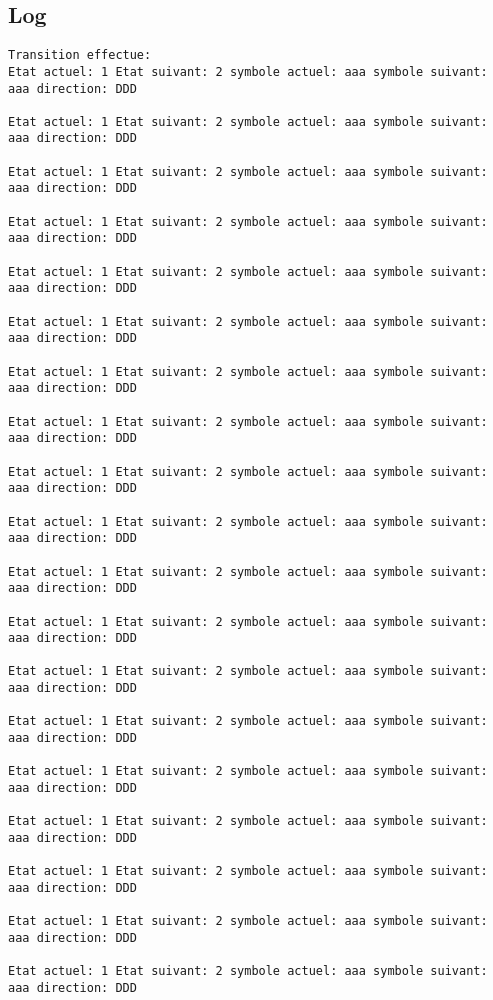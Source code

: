 \documentclass{article}
\begin{document}
\subsection{Log}
\begin{verbatim}
Transition effectue:
Etat actuel: 1 Etat suivant: 2 symbole actuel: aaa symbole suivant: aaa direction: DDD

Etat actuel: 1 Etat suivant: 2 symbole actuel: aaa symbole suivant: aaa direction: DDD

Etat actuel: 1 Etat suivant: 2 symbole actuel: aaa symbole suivant: aaa direction: DDD

Etat actuel: 1 Etat suivant: 2 symbole actuel: aaa symbole suivant: aaa direction: DDD

Etat actuel: 1 Etat suivant: 2 symbole actuel: aaa symbole suivant: aaa direction: DDD

Etat actuel: 1 Etat suivant: 2 symbole actuel: aaa symbole suivant: aaa direction: DDD

Etat actuel: 1 Etat suivant: 2 symbole actuel: aaa symbole suivant: aaa direction: DDD

Etat actuel: 1 Etat suivant: 2 symbole actuel: aaa symbole suivant: aaa direction: DDD

Etat actuel: 1 Etat suivant: 2 symbole actuel: aaa symbole suivant: aaa direction: DDD

Etat actuel: 1 Etat suivant: 2 symbole actuel: aaa symbole suivant: aaa direction: DDD

Etat actuel: 1 Etat suivant: 2 symbole actuel: aaa symbole suivant: aaa direction: DDD

Etat actuel: 1 Etat suivant: 2 symbole actuel: aaa symbole suivant: aaa direction: DDD

Etat actuel: 1 Etat suivant: 2 symbole actuel: aaa symbole suivant: aaa direction: DDD

Etat actuel: 1 Etat suivant: 2 symbole actuel: aaa symbole suivant: aaa direction: DDD

Etat actuel: 1 Etat suivant: 2 symbole actuel: aaa symbole suivant: aaa direction: DDD

Etat actuel: 1 Etat suivant: 2 symbole actuel: aaa symbole suivant: aaa direction: DDD

Etat actuel: 1 Etat suivant: 2 symbole actuel: aaa symbole suivant: aaa direction: DDD

Etat actuel: 1 Etat suivant: 2 symbole actuel: aaa symbole suivant: aaa direction: DDD

Etat actuel: 1 Etat suivant: 2 symbole actuel: aaa symbole suivant: aaa direction: DDD


\end{verbatim}
\end{document}
